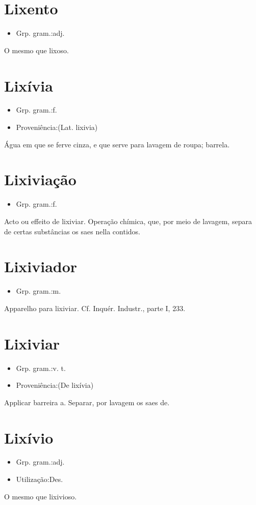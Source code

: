 \section{Lixento}
\begin{itemize}
\item {Grp. gram.:adj.}
\end{itemize}
O mesmo que \textunderscore lixoso\textunderscore .
\section{Lixívia}
\begin{itemize}
\item {Grp. gram.:f.}
\end{itemize}
\begin{itemize}
\item {Proveniência:(Lat. \textunderscore lixivia\textunderscore )}
\end{itemize}
Água em que se ferve cinza, e que serve para lavagem de roupa; barrela.
\section{Lixiviação}
\begin{itemize}
\item {Grp. gram.:f.}
\end{itemize}
Acto ou effeito de lixiviar.
Operação chímica, que, por meio de lavagem, separa de certas substâncias os saes nella contidos.
\section{Lixiviador}
\begin{itemize}
\item {Grp. gram.:m.}
\end{itemize}
Apparelho para lixiviar. Cf. \textunderscore Inquér. Industr.\textunderscore , parte I, 233.
\section{Lixiviar}
\begin{itemize}
\item {Grp. gram.:v. t.}
\end{itemize}
\begin{itemize}
\item {Proveniência:(De \textunderscore lixívia\textunderscore )}
\end{itemize}
Applicar barreira a.
Separar, por lavagem os saes de.
\section{Lixívio}
\begin{itemize}
\item {Grp. gram.:adj.}
\end{itemize}
\begin{itemize}
\item {Utilização:Des.}
\end{itemize}
O mesmo que \textunderscore lixivioso\textunderscore .
